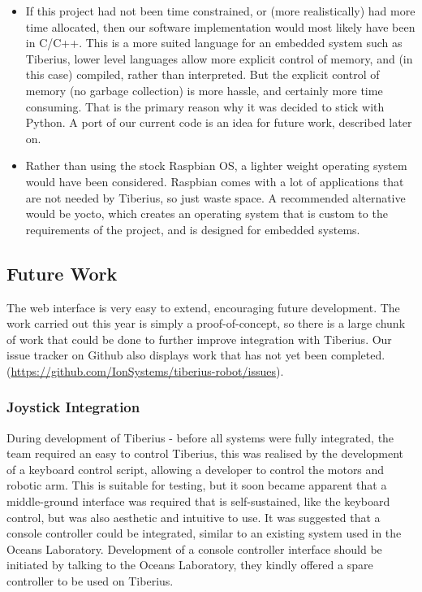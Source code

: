 \begin{itemize}
\item If this project had not been time constrained, or (more realistically) had more time allocated, then our software implementation would most likely have been in C/C++. This is a more suited language for an embedded system such as Tiberius, lower level languages allow more explicit control of memory, and (in this case) compiled, rather than interpreted. But the explicit control of memory (no garbage collection) is more hassle, and certainly more time consuming. That is the primary reason why it was decided to stick with Python. A port of our current code is an idea for future work, described later on.

\item Rather than using the stock Raspbian OS, a lighter weight operating system would have been considered. Raspbian comes with a lot of applications that are not needed by Tiberius, so just waste space. A recommended alternative would be \gls{yocto}, which creates an  operating system that is custom to the requirements of the project, and is designed for embedded systems.

\end{itemize}

\subsection{Future Work}
\label{sec:web_future_work}

The web interface is very easy to extend, encouraging future development.
The work carried out this year is simply a proof-of-concept, so there is a large chunk of work that could be done to further improve integration with Tiberius.
\newline
Our issue tracker on Github also displays work that has not yet been completed. (\url{https://github.com/IonSystems/tiberius-robot/issues}).

\subsubsection{Joystick Integration}
During development of Tiberius - before all systems were fully integrated, the team required an easy
to control Tiberius, this was realised by the development of a keyboard control script, allowing a developer to control the motors and robotic arm. This is suitable for testing, but it soon became apparent that a middle-ground interface was required that is self-sustained, like the keyboard control, but was also aesthetic and intuitive to use.
\newline
It was suggested that a console controller could be integrated, similar to an existing system used in the Oceans Laboratory. Development of a console controller interface should be initiated by talking to the Oceans Laboratory, they kindly offered a spare controller to be used on Tiberius.


